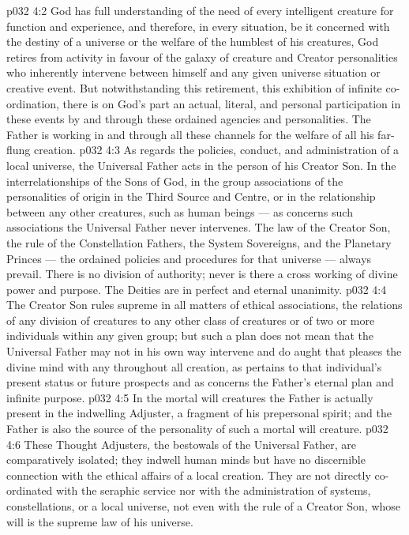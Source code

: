 \vs p032 4:2 God has full understanding of the need of every intelligent creature for function and experience, and therefore, in every situation, be it concerned with the destiny of a universe or the welfare of the humblest of his creatures, God retires from activity in favour of the galaxy of creature and Creator personalities who inherently intervene between himself and any given universe situation or creative event. But notwithstanding this retirement, this exhibition of infinite co\hyp{}ordination, there is on God’s part an actual, literal, and personal participation in these events by and through these ordained agencies and personalities. The Father is working in and through all these channels for the welfare of all his far\hyp{}flung creation.
\vs p032 4:3 \pc As regards the policies, conduct, and administration of a local universe, the Universal Father acts in the person of his Creator Son. In the interrelationships of the Sons of God, in the group associations of the personalities of origin in the Third Source and Centre, or in the relationship between any other creatures, such as human beings --- as concerns such associations the Universal Father never intervenes. The law of the Creator Son, the rule of the Constellation Fathers, the System Sovereigns, and the Planetary Princes --- the ordained policies and procedures for that universe --- always prevail. There is no division of authority; never is there a cross working of divine power and purpose. The Deities are in perfect and eternal unanimity.
\vs p032 4:4 The Creator Son rules supreme in all matters of ethical associations, the relations of any division of creatures to any other class of creatures or of two or more individuals within any given group; but such a plan does not mean that the Universal Father may not in his own way intervene and do aught that pleases the divine mind with any  throughout all creation, as pertains to that individual’s present status or future prospects and as concerns the Father’s eternal plan and infinite purpose.
\vs p032 4:5 \pc In the mortal will creatures the Father is actually present in the indwelling Adjuster, a fragment of his prepersonal spirit; and the Father is also the source of the personality of such a mortal will creature.
\vs p032 4:6 \pc These Thought Adjusters, the bestowals of the Universal Father, are comparatively isolated; they indwell human minds but have no discernible connection with the ethical affairs of a local creation. They are not directly co\hyp{}ordinated with the seraphic service nor with the administration of systems, constellations, or a local universe, not even with the rule of a Creator Son, whose will is the supreme law of his universe.
